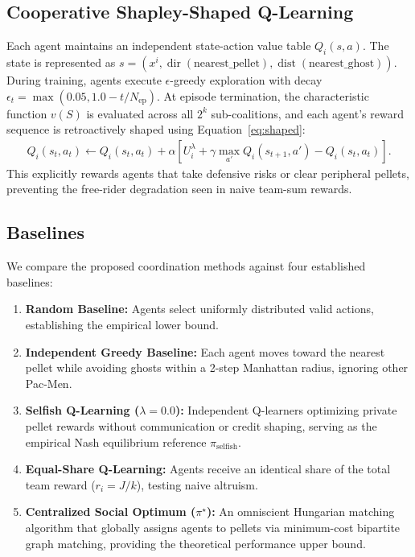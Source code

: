 \documentclass{article}
\begin{document}
\subsection{Cooperative Shapley-Shaped Q-Learning}
Each agent maintains an independent state-action value table $Q_i(s, a)$. The state is represented as $s = (x^i, \operatorname{dir}(\mathrm{nearest\_pellet}), \operatorname{dist}(\mathrm{nearest\_ghost}))$. During training, agents execute $\epsilon$-greedy exploration with decay $\epsilon_t = \max(0.05, 1.0 - t/N_{\mathrm{ep}})$. At episode termination, the characteristic function $v(S)$ is evaluated across all $2^k$ sub-coalitions, and each agent's reward sequence is retroactively shaped using Equation~\eqref{eq:shaped}:
\begin{align}
Q_i(s_t, a_t) \leftarrow Q_i(s_t, a_t) + \alpha \left[ U_i^\lambda + \gamma \max_{a'} Q_i(s_{t+1}, a') - Q_i(s_t, a_t) \right].
\end{align}
This explicitly rewards agents that take defensive risks or clear peripheral pellets, preventing the free-rider degradation seen in naive team-sum rewards.

\subsection{Baselines}
We compare the proposed coordination methods against four established baselines:
\begin{enumerate}
    \item \textbf{Random Baseline:} Agents select uniformly distributed valid actions, establishing the empirical lower bound.
    \item \textbf{Independent Greedy Baseline:} Each agent moves toward the nearest pellet while avoiding ghosts within a 2-step Manhattan radius, ignoring other Pac-Men.
    \item \textbf{Selfish Q-Learning ($\lambda = 0.0$):} Independent Q-learners optimizing private pellet rewards without communication or credit shaping, serving as the empirical Nash equilibrium reference $\pi_{\mathrm{selfish}}$.
    \item \textbf{Equal-Share Q-Learning:} Agents receive an identical share of the total team reward ($r_i = J/k$), testing naive altruism.
    \item \textbf{Centralized Social Optimum ($\pi^\star$):} An omniscient Hungarian matching algorithm that globally assigns agents to pellets via minimum-cost bipartite graph matching, providing the theoretical performance upper bound.
\end{enumerate}
\end{document}
